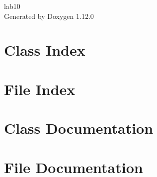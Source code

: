\documentclass[twoside]{book}
\newcommand{\+}{\discretionary{\mbox{\scriptsize$\hookleftarrow$}}{}{}}
\newcommand{\clearemptydoublepage}{%
    \newpage{\pagestyle{empty}\cleardoublepage}%
  }
\begin{document}
  \raggedbottom
    \hypersetup{pageanchor=false,
                bookmarksnumbered=true,
                pdfencoding=unicode
               }
  \begin{titlepage}
  \vspace*{7cm}
  \begin{center}%
  {\Large lab10}\\
  \vspace*{1cm}
  {\large Generated by Doxygen 1.12.0}\\
  \end{center}
  \end{titlepage}
  \clearemptydoublepage
  \tableofcontents
  \clearemptydoublepage
  \hypersetup{pageanchor=true}
\chapter{Class Index}

\chapter{File Index}

\chapter{Class Documentation}







\chapter{File Documentation}








  \backmatter
  \newpage
  \clearemptydoublepage
  \printindex
\end{document}
